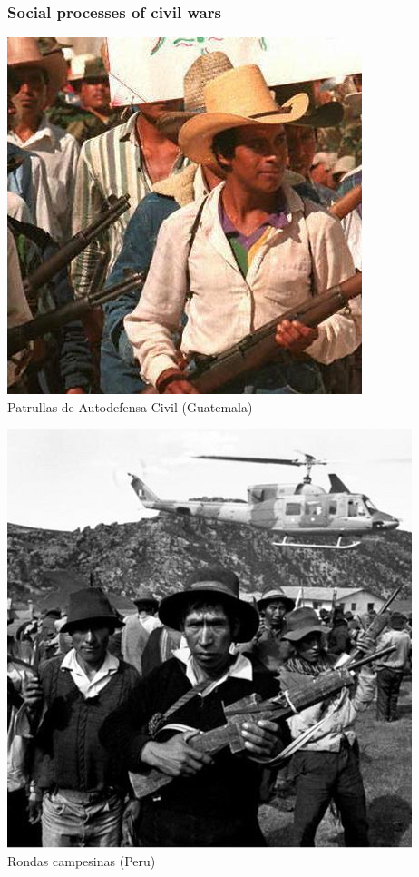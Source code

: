 \documentclass[aspectratio=43]{beamer}
\begin{document}
\begin{frame}
\frametitle{Social processes of civil wars}
\centering

\begin{minipage}{0.49\textwidth}\centering
\includegraphics[width = \textwidth]{img/pac}\\
Patrullas de Autodefensa Civil (Guatemala)
\end{minipage}\hfill
\begin{minipage}{0.49\textwidth}\centering
\includegraphics[width = \textwidth]{img/ronda-campesina}\\
Rondas campesinas (Peru)
\end{minipage}

\end{frame}
\end{document}
